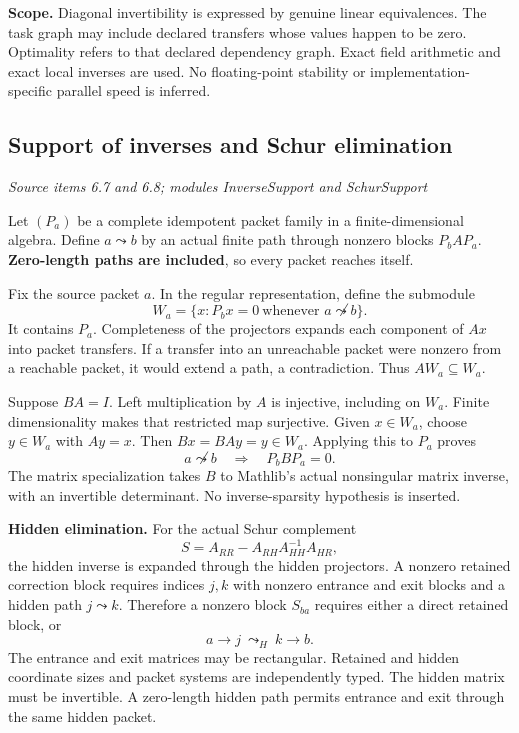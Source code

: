 \textbf{Scope.} Diagonal invertibility is expressed by genuine linear equivalences. The task graph may include declared transfers whose values happen to be zero. Optimality refers to that declared dependency graph. Exact field arithmetic and exact local inverses are used. No floating-point stability or implementation-specific parallel speed is inferred.



\subsection{Support of inverses and Schur elimination}\label{supp5:subsection:003}\textit{Source items 6.7 and 6.8; modules InverseSupport and SchurSupport}\par
Let $(P_a)$ be a complete idempotent packet family in a finite-dimensional algebra. Define $a\leadsto b$ by an actual finite path through nonzero blocks $P_bAP_a$. \textbf{Zero-length paths are included}, so every packet reaches itself.

Fix the source packet $a$. In the regular representation, define the submodule
\[
W_a=\{x:P_bx=0\ \text{whenever }a\not\leadsto b\}.
\]
It contains $P_a$. Completeness of the projectors expands each component of $Ax$ into packet transfers. If a transfer into an unreachable packet were nonzero from a reachable packet, it would extend a path, a contradiction. Thus $AW_a\subseteq W_a$.

Suppose $BA=I$. Left multiplication by $A$ is injective, including on $W_a$. Finite dimensionality makes that restricted map surjective. Given $x\in W_a$, choose $y\in W_a$ with $Ay=x$. Then $Bx=BAy=y\in W_a$. Applying this to $P_a$ proves
\[
\boxed{a\not\leadsto b\quad\Longrightarrow\quad P_bBP_a=0.}
\]
The matrix specialization takes $B$ to Mathlib's actual nonsingular matrix inverse, with an invertible determinant. No inverse-sparsity hypothesis is inserted.

\textbf{Hidden elimination.} For the actual Schur complement
\[
S=A_{RR}-A_{RH}A_{HH}^{-1}A_{HR},
\]
the hidden inverse is expanded through the hidden projectors. A nonzero retained correction block requires indices $j,k$ with nonzero entrance and exit blocks and a hidden path $j\leadsto k$. Therefore a nonzero block $S_{ba}$ requires either a direct retained block, or
\[
a\longrightarrow j\ \leadsto_{H}\ k\longrightarrow b.
\]
The entrance and exit matrices may be rectangular. Retained and hidden coordinate sizes and packet systems are independently typed. The hidden matrix must be invertible. A zero-length hidden path permits entrance and exit through the same hidden packet.

